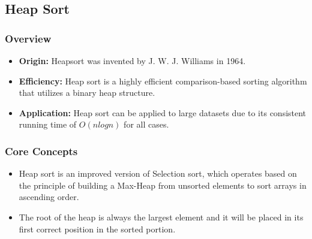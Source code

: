 \subsection[Heap Sort]{Heap Sort \cite{williams1964heapsort}}

\subsubsection{Overview}
\begin{itemize}
    \item \textbf{Origin:} Heapsort was invented by J. W. J. Williams in 1964.
    \item \textbf{Efficiency:} Heap sort is a highly efficient comparison-based sorting algorithm that utilizes a binary heap structure.
    \item \textbf{Application:} Heap sort can be applied to large datasets due to its consistent running time of $O(nlogn)$ for all cases.
\end{itemize}

\subsubsection{Core Concepts}
\begin{itemize}
    \item Heap sort is an improved version of Selection sort, which operates based on the principle of building a Max-Heap from unsorted elements to sort arrays in ascending order.
    \item The root of the heap is always the largest element and it will be placed in its first correct position in the sorted portion.
\end{itemize}

